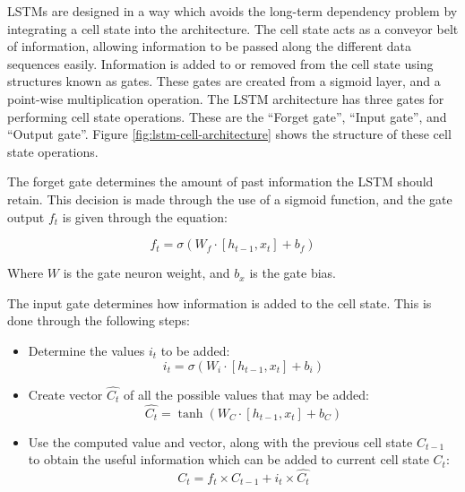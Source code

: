 LSTMs are designed in a way which avoids the long-term dependency problem by integrating a cell state into the architecture. The cell state acts as a conveyor belt of information, allowing information to be passed along the different data sequences easily. Information is added to or removed from the cell state using structures known as gates. These gates are created from a sigmoid layer, and a point-wise multiplication operation. The LSTM architecture has three gates for performing cell state operations. These are the ``Forget gate'', ``Input gate'', and ``Output gate''. Figure \ref{fig:lstm-cell-architecture} shows the structure of these cell state operations.\par

The forget gate determines the amount of past information the LSTM should retain. This decision is made through the use of a sigmoid function, and the gate output $f_{t}$ is given through the equation:

\begin{equation}
    f_{t} = \sigma(W_{f}\cdot[h_{t-1}, x_{t}] + b_{f})
\end{equation}

Where $W$ is the gate neuron weight, and $b_{x}$ is the gate bias.\par

The input gate determines how information is added to the cell state. This is done through the following steps:
\begin{itemize}
    \item Determine the values $i_{t}$ to be added:
    \begin{equation}
        \label{eqn:input-gate}
        i_{t} = \sigma(W_{i}\cdot[h_{t-1}, x_{t}] + b_{i})
    \end{equation}
    \item Create vector $\hat{C_{t}}$ of all the possible values that may be added:
    \begin{equation}
        \hat{C_{t}} = \tanh( W_{C}\cdot[h_{t-1}, x_{t}] + b_{C})
    \end{equation}
    \item Use the computed value and vector, along with the previous cell state $C_{t-1}$ to obtain the useful information which can be added to current cell state $C_{t}$:
    \begin{equation}
        C_{t} = f_{t} \times C_{t-1} + i_{t} \times \hat{C_{t}}
    \end{equation}
\end{itemize}

